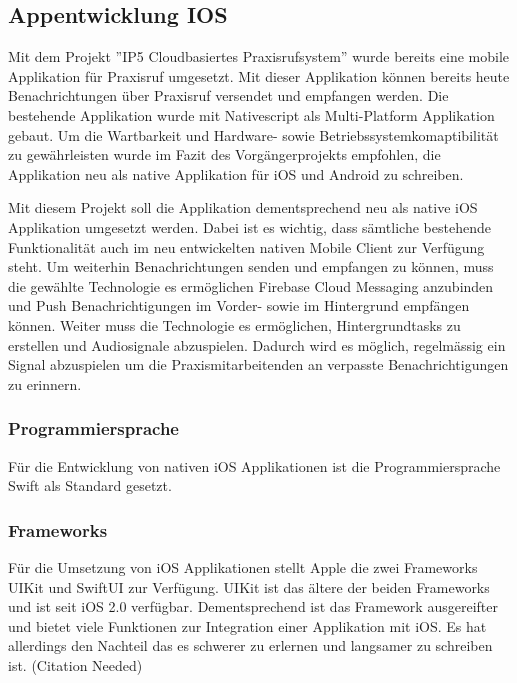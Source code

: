 
\subsection{Appentwicklung IOS}

Mit dem Projekt ''IP5 Cloudbasiertes Praxisrufsystem''\cite{ip5} wurde bereits eine mobile Applikation für Praxisruf umgesetzt.
Mit dieser Applikation können bereits heute Benachrichtungen über Praxisruf versendet und empfangen werden.
Die bestehende Applikation wurde mit Nativescript als Multi-Platform Applikation gebaut.
Um die Wartbarkeit und Hardware- sowie Betriebssystemkomaptibilität zu gewährleisten wurde im Fazit des Vorgängerprojekts empfohlen,
die Applikation neu als native Applikation für iOS und Android zu schreiben.\cite{ip5}

Mit diesem Projekt soll die Applikation dementsprechend neu als native iOS Applikation umgesetzt werden.
Dabei ist es wichtig, dass sämtliche bestehende Funktionalität auch im neu entwickelten nativen Mobile Client zur Verfügung steht.
Um weiterhin Benachrichtungen senden und empfangen zu können, muss die gewählte Technologie es ermöglichen Firebase Cloud Messaging anzubinden
und Push Benachrichtigungen im Vorder- sowie im Hintergrund empfängen können.
Weiter muss die Technologie es ermöglichen, Hintergrundtasks zu erstellen und Audiosignale abzuspielen.
Dadurch wird es möglich, regelmässig ein Signal abzuspielen um die Praxismitarbeitenden an verpasste Benachrichtigungen zu erinnern.

\subsubsection*{Programmiersprache}

Für die Entwicklung von nativen iOS Applikationen ist die Programmiersprache Swift als Standard gesetzt.\cite{ios_swift}


\subsubsection*{Frameworks}

Für die Umsetzung von iOS Applikationen stellt Apple die zwei Frameworks UIKit\cite{ios_uikit} und SwiftUI\cite{ios_swift_ui} zur Verfügung.
UIKit ist das ältere der beiden Frameworks und ist seit iOS 2.0 verfügbar.
Dementsprechend ist das Framework ausgereifter und bietet viele Funktionen zur Integration einer Applikation mit iOS.
Es hat allerdings den Nachteil das es schwerer zu erlernen und langsamer zu schreiben ist. (Citation Needed)

